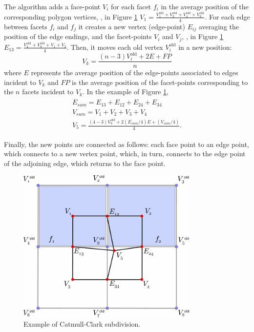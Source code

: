 The algorithm adds a face-point $V_i$ for each facet $f_i$ in the average position of the corresponding polygon vertices, \eg, in Figure \ref{fig:subdivisionCatmull} $V_1 = \frac{V_1^{\text{old}} + V_2^{\text{old}} + V_4^{\text{old}} + V_9^{\text{old}}}{4}$. 
For each edge between facets $f_{i}$ and $f_{j}$ it creates a new vertex (edge-point) $E_{ij}$ averaging the position of the edge endings, and the facet-points $V_{i}$ and $V_{j}$, \eg, in Figure \ref{fig:subdivisionCatmull} $E_{13} = \frac{V_4^{\text{old}} + V_9^{\text{old}} + V_1 + V_3}{4}$.
Then, it moves each old vertex $V_i^{\text{old}}$ in a new position:
\[
V_k = \frac{(n-3)V_i^{\text{old}} + 2E + FP}{n}
\]
where $E$ represents the average position of the edge-points associated to edges incident to $V_k$ and  $FP$ is the average position of the facet-points corresponding to the $n$ facets incident to $V_k$. In the example of Figure \ref{fig:subdivisionCatmull}, 
\begin{align}
\begin{split}
    E_{sum} = E_{13}+E_{12}+E_{24}+E_{34}\\
    V_{sum} = V_1+V_2+V_3+V_4\\
    V_5 = \frac{(4-3)V_9^{\text{old}} + 2(E_{sum}/4)E + (V_{sum}/4)}{4}.
\end{split}
\end{align}




Finally, the new points are connected as follows: each face point to an edge point, which connects to a new vertex point, which, in turn, connects to the edge point of the adjoining edge, which returns to the face point.


\begin{figure}
\begin{center}
\centering
  \includegraphics[width=0.8\textwidth]{./img/subdivisionCatmull}
 \caption{Example of Catmull-Clark subdivision.}
 \label{fig:subdivisionCatmull}
\end{center}
\end{figure}

